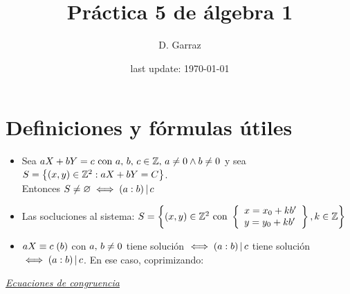\documentclass[12pt,a4paper, spanish]{article}
\begin{document}
\pagestyle{empty} %

\title{Práctica 5 de álgebra 1} %
\author{D. Garraz} %
\date{last update: \today} %

\maketitle  %

\section{Definiciones y fórmulas útiles}

\def\mcd{(a:b)}

\begin{itemize}
	\item Sea $aX + bY = c \text{ con } a,\, b,\, c \en \enteros,\, a \distinto 0 \y b \distinto 0$ y sea
    $S = \set{ (x,y) \en \enteros^2 : aX + bY = C }$.\\
    Entonces $S \distinto \vacio \sisolosi (a:b) \divide c$

  \item Las socluciones al sistema: $S = \set{(x,y) \en \enteros^2 \text{ con }
    \llaves{l}{
     x = x_0 + kb'\\ 
     y = y_0 + kb' 
    }
    , k \en \enteros}
    $

  \item $\congruencia{aX}{c}{b}$ con $ a,\, b \distinto 0$ tiene solución $\sisolosi \mcd \divide c$ tiene solución $\sisolosi \mcd \divide c$. En ese caso, coprimizando:
\end{itemize}

\textit\underline{Ecuaciones de congruencia}
\end{document}
